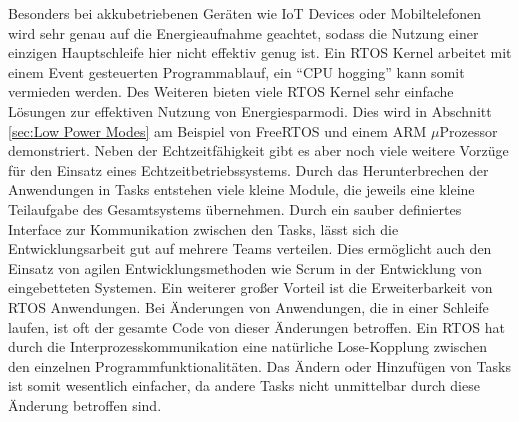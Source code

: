 Besonders bei akkubetriebenen Geräten wie IoT Devices oder Mobiltelefonen wird sehr genau auf die Energieaufnahme geachtet, sodass die Nutzung einer einzigen Hauptschleife hier nicht effektiv genug ist. Ein RTOS Kernel arbeitet mit einem Event gesteuerten Programmablauf, ein "`CPU hogging"' kann somit vermieden werden. Des Weiteren bieten viele RTOS Kernel sehr einfache Lö\-sun\-gen zur effektiven Nutzung von Energiesparmodi. Dies wird in Abschnitt \ref{sec:Low Power Modes} am Beispiel von FreeRTOS und einem ARM $\mu$Prozessor demonstriert. Neben der Echt\-zeit\-fähig\-keit gibt es aber noch viele weitere Vorzüge für den Einsatz eines Echtzeitbetriebssystems. Durch das Herunterbrechen der Anwendungen in Tasks entstehen viele kleine Module, die jeweils eine kleine Teilaufgabe des Gesamtsystems über\-neh\-men. Durch ein sauber definiertes Interface zur Kommunikation zwischen den Tasks, lässt sich die Entwicklungsarbeit gut auf mehrere Teams verteilen. Dies ermöglicht auch den Einsatz von agilen Entwicklungsmethoden wie Scrum in der Entwicklung von eingebetteten Systemen. Ein weiterer großer Vorteil ist die Erweiterbarkeit von RTOS Anwendungen. Bei Änderungen von Anwendungen, die in einer Schleife laufen, ist oft der gesamte Code von dieser Änderungen betroffen. Ein RTOS hat durch die Interprozesskommunikation eine natürliche Lose-Kopplung zwischen den einzelnen Programmfunktionalitäten. Das Än\-dern oder Hinzufügen von Tasks ist somit wesentlich einfacher, da andere Tasks nicht unmittelbar durch diese Än\-der\-ung betroffen sind. 